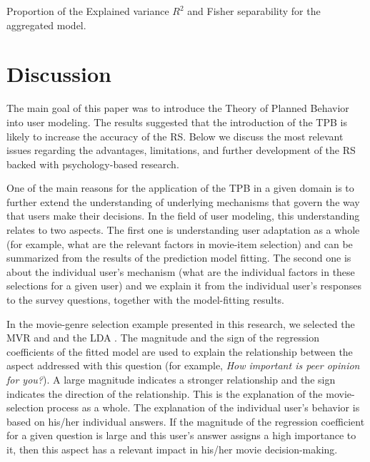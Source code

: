 \documentclass{llncs}
\begin{document}
\begin{table}[!h]
  \centering
   
  \caption{Proportion of the Explained variance $R^2$ and Fisher separability for the aggregated model.}
  \label{Tab_all_R2andSeps}
\end{table}



 




\section{Discussion}\label{Sec_Disc}

The main goal of this paper was to introduce the Theory of Planned Behavior into user modeling. The results suggested that the introduction of the TPB is likely to increase the accuracy of the RS. Below we discuss the most relevant issues regarding the advantages, limitations, and further development of the RS backed with psychology-based research. 

\vspace{0.6em}
 One of the main reasons for the application of the TPB in a given domain is to further extend the understanding of underlying mechanisms that govern the way that users make their decisions. In the field of user modeling, this understanding relates to two aspects. The first one is understanding user adaptation as a whole (for example, what are the relevant factors in movie-item selection) and can be summarized from the results of the prediction model fitting. The second one is about the individual user’s mechanism (what are the individual factors in these selections for a given user) and we explain it from the individual user’s responses to the survey questions, together with the model-fitting results.

In the movie-genre selection example presented in this research, we selected the MVR \cite{CohenCohenWestAiken200208} and and the LDA \cite{RencherChristensen201207}. The magnitude and the sign of the regression coefficients of the fitted model are used to explain the relationship between the aspect addressed with this question (for example, {\it How important is peer opinion for you?}). A large magnitude indicates a stronger relationship and the sign indicates the direction of the relationship. This is the explanation of the movie-selection process as a whole. The explanation of the individual user’s behavior is based on his/her individual answers. If the magnitude of the regression coefficient for a given question is large and this user’s answer assigns a high importance to it, then this aspect has a relevant impact in his/her movie decision-making.
\end{document}
